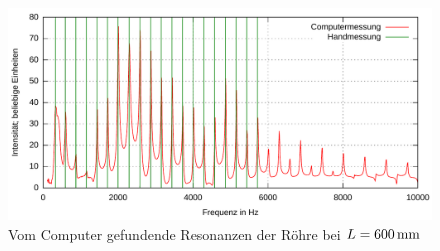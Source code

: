 \documentclass[numbers=noenddot,12pt,a4paper]{scrartcl}
\begin{document}
\begin{figure}[H]
	\includegraphics[width=\textwidth]{messwerte/resonanzfrequenzencomputer.pdf}
	\caption{Vom Computer gefundende Resonanzen der Röhre bei $L=\unit[600]{mm}$}\label{img:resonatorcomp}
\end{figure}
\end{document}
